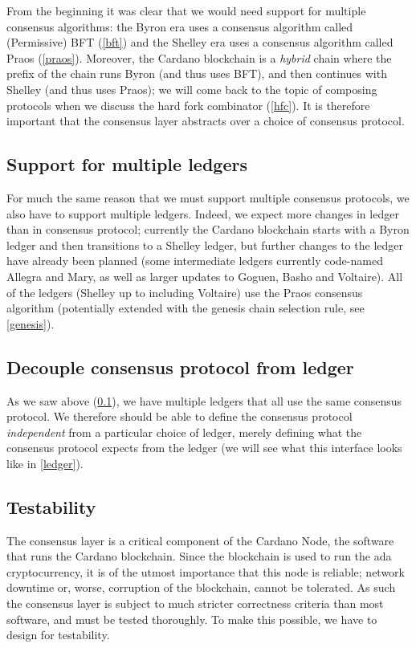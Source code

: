 From the beginning it was clear that we would need support for multiple
consensus algorithms: the Byron era uses a consensus algorithm called
(Permissive) BFT (\cref{bft}) and the Shelley era uses a consensus algorithm
called Praos (\cref{praos}). Moreover, the Cardano blockchain is a \emph{hybrid}
chain where the prefix of the chain runs Byron (and thus uses BFT), and then
continues with Shelley (and thus uses Praos); we will come back to the topic of
composing protocols when we discuss the hard fork combinator (\cref{hfc}). It is
therefore important that the consensus layer abstracts over a choice of
consensus protocol.

\subsection{Support for multiple ledgers}
\label{multiple-ledgers}

For much the same reason that we must support multiple consensus protocols, we
also have to support multiple ledgers. Indeed, we expect more changes in ledger
than in consensus protocol; currently the Cardano blockchain starts with a
Byron ledger and then transitions to a Shelley ledger, but further changes to
the ledger have already been planned (some intermediate ledgers currently
code-named Allegra and Mary, as well as larger updates to Goguen, Basho and
Voltaire). All of the ledgers (Shelley up to including Voltaire)
use the Praos consensus algorithm (potentially extended with the genesis chain
selection rule, see \cref{genesis}).

\subsection{Decouple consensus protocol from ledger}
\label{decouple-consensus-ledger}

As we saw above (\cref{multiple-ledgers}), we have multiple ledgers that all
use the same consensus protocol. We therefore should be able to define the
consensus protocol \emph{independent} from a particular choice of ledger,
merely defining what the consensus protocol expects from the ledger
(we will see what this interface looks like in \cref{ledger}).

\subsection{Testability}
\label{testability}

The consensus layer is a critical component of the Cardano Node, the software
that runs the Cardano blockchain. Since the blockchain is used to run the ada
cryptocurrency, it is of the utmost importance that this node is reliable;
network downtime or, worse, corruption of the blockchain, cannot be tolerated.
As such the consensus layer is subject to much stricter correctness criteria
than most software, and must be tested thoroughly. To make this possible, we
have to design for testability.

